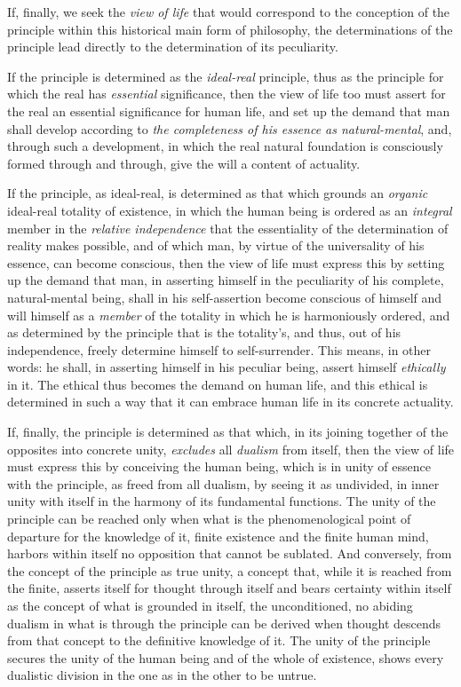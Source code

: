 If, finally, we seek the \emph{view of life} that would correspond to
the conception of the principle within this historical main form of
philosophy, the determinations of the principle lead directly to the
determination of its peculiarity.

If the principle is determined as the \emph{ideal-real} principle, thus
as the principle for which the real has \emph{essential} significance,
then the view of life too must assert for the real an essential
significance for human life, and set up the demand that man shall
develop according to \emph{the completeness of his essence as
natural-mental}, and, through such a development, in which the real
natural foundation is consciously formed through and through, give the
will a content of actuality.

If the principle, as ideal-real, is determined as that which grounds an
\emph{organic} ideal-real totality of existence, in which the human
being is ordered as an \emph{integral} member in the \emph{relative
independence} that the essentiality of the determination of reality
makes possible, and of which man, by virtue of the universality of his
essence, can become conscious, then the view of life must express this
by setting up the demand that man, in asserting himself in the
peculiarity of his complete, natural-mental being, shall in his
self-assertion become conscious of himself and will himself as a
\emph{member} of the totality in which he is harmoniously ordered, and
as determined by the principle that is the totality's, and thus, out of
his independence, freely determine himself to self-surrender. This
means, in other words: he shall, in asserting himself in his peculiar
being, assert himself \emph{ethically} in it. The ethical thus becomes
the demand on human life, and this ethical is determined in such a way
that it can embrace human life in its concrete actuality.

If, finally, the principle is determined as that which, in its joining
together of the opposites into concrete unity, \emph{excludes} all
\emph{dualism} from itself, then the view of life must express this by
conceiving the human being, which is in unity of essence with the
principle, as freed from all dualism, by seeing it as undivided, in
inner unity with itself in the harmony of its fundamental functions.
The unity of the principle can be reached only when what is the
phenomenological point of departure for the knowledge of it, finite
existence and the finite human mind, harbors within
 \setcounter{footnote}{0}itself no opposition that cannot be
sublated. And conversely, from the concept of the principle as true
unity, a concept that, while it is reached from the finite, asserts
itself for thought through itself and bears certainty within itself as
the concept of what is grounded in itself, the unconditioned, no
abiding dualism in what is through the principle can be derived when
thought descends from that concept to the definitive knowledge of it.
The unity of the principle secures the unity of the human being and of
the whole of existence, shows every dualistic division in the one as in
the other to be untrue.

